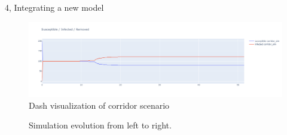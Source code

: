 \documentclass[10pt,a4paper]{article}
\begin{document}
\begin{task}{4, Integrating a new model}
\begin{figure}[H]
    \includegraphics[scale=0.3]{images/4.5/4.5.2/corridor_dash.png}
    \caption{Dash visualization of corridor scenario}
    \label{fig:corridor-dash}
\end{figure}

\begin{figure}[H]
    \centering
    \vfill
    \vfill
    \caption{Simulation evolution from left to right.}
    \label{fig:4.5.2}
\end{figure}


\end{task}
\end{document}
